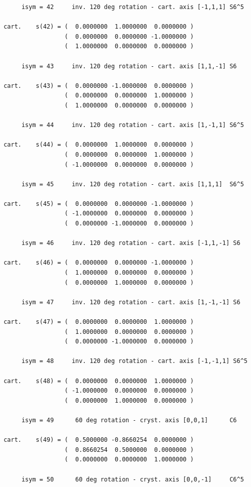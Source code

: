 \documentclass[12pt,a4paper]{article}
\begin{document}
\begin{verbatim}
      isym = 42     inv. 120 deg rotation - cart. axis [-1,1,1] S6^5

 cart.    s(42) = (  0.0000000  1.0000000  0.0000000 )
                  (  0.0000000  0.0000000 -1.0000000 )
                  (  1.0000000  0.0000000  0.0000000 )

      isym = 43     inv. 120 deg rotation - cart. axis [1,1,-1] S6

 cart.    s(43) = (  0.0000000 -1.0000000  0.0000000 )
                  (  0.0000000  0.0000000  1.0000000 )
                  (  1.0000000  0.0000000  0.0000000 )

      isym = 44     inv. 120 deg rotation - cart. axis [1,-1,1] S6^5

 cart.    s(44) = (  0.0000000  1.0000000  0.0000000 )
                  (  0.0000000  0.0000000  1.0000000 )
                  ( -1.0000000  0.0000000  0.0000000 )

      isym = 45     inv. 120 deg rotation - cart. axis [1,1,1]  S6^5

 cart.    s(45) = (  0.0000000  0.0000000 -1.0000000 )
                  ( -1.0000000  0.0000000  0.0000000 )
                  (  0.0000000 -1.0000000  0.0000000 )

      isym = 46     inv. 120 deg rotation - cart. axis [-1,1,-1] S6

 cart.    s(46) = (  0.0000000  0.0000000 -1.0000000 )
                  (  1.0000000  0.0000000  0.0000000 )
                  (  0.0000000  1.0000000  0.0000000 )

      isym = 47     inv. 120 deg rotation - cart. axis [1,-1,-1] S6 

 cart.    s(47) = (  0.0000000  0.0000000  1.0000000 )
                  (  1.0000000  0.0000000  0.0000000 )
                  (  0.0000000 -1.0000000  0.0000000 )

      isym = 48     inv. 120 deg rotation - cart. axis [-1,-1,1] S6^5

 cart.    s(48) = (  0.0000000  0.0000000  1.0000000 )
                  ( -1.0000000  0.0000000  0.0000000 )
                  (  0.0000000  1.0000000  0.0000000 )

      isym = 49      60 deg rotation - cryst. axis [0,0,1]      C6

 cart.    s(49) = (  0.5000000 -0.8660254  0.0000000 )
                  (  0.8660254  0.5000000  0.0000000 )
                  (  0.0000000  0.0000000  1.0000000 )

      isym = 50      60 deg rotation - cryst. axis [0,0,-1]     C6^5


\end{verbatim}
\end{document}
